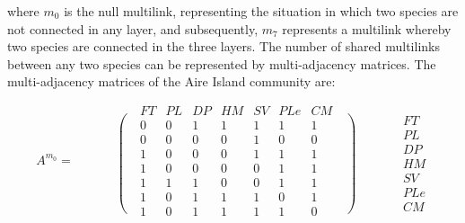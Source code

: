 where  $m_0$ is the null multilink, representing the situation in which two species are not connected in any layer, and subsequently,  $m_7$ represents a multilink whereby two species are connected in the three layers. The number of shared multilinks between any two species can be represented by multi-adjacency matrices. The multi-adjacency matrices of the Aire Island community are:

\begin{equation*}
A^{m_0}=\begin{matrix}\text{ }\\\left.\phantom{\begin{matrix}\mathit{FT}\\\mathit{PL}\\\mathit{DP}\\\mathit{HM}\\\mathit{SV}\\\mathit{PLe}\\\mathit{CM}\end{matrix}}\right(\end{matrix}\begin{matrix}\mathit{FT}&\mathit{PL}&\mathit{DP}&\mathit{HM}&\mathit{SV}&\mathit{PLe}&\mathit{CM}\\0&0&1&1&1&1&1\\0&0&0&0&1&0&0\\1&0&0&0&1&1&1\\1&0&0&0&0&1&1\\1&1&1&0&0&1&1\\1&0&1&1&1&0&1\\1&0&1&1&1&1&0\end{matrix}\begin{matrix}\text{ }\\\left)\phantom{\begin{matrix}\mathit{FT}\\\mathit{PL}\\\mathit{DP}\\\mathit{HM}\\\mathit{SV}\\\mathit{PLe}\\\mathit{CM}\end{matrix}}\right.\end{matrix}\begin{matrix}\text{ }\\\mathit{FT}\\\mathit{PL}\\\mathit{DP}\\\mathit{HM}\\\mathit{SV}\\\mathit{PLe}\\\mathit{CM}\end{matrix}
\end{equation*}

